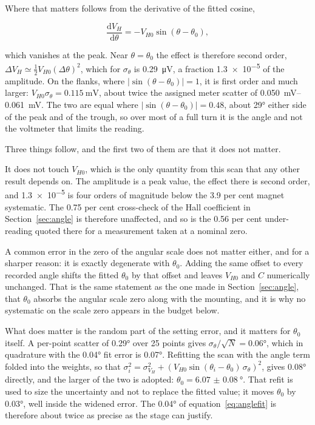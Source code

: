 \documentclass[11pt,a4paper]{article}
\begin{document}
Where that matters follows from the derivative of the fitted cosine,

\begin{equation}
\frac{\mathrm{d}V_H}{\mathrm{d}\theta} = -V_{H0}\sin(\theta-\theta_0),
\label{eq:angderiv}
\end{equation}

which vanishes at the peak. Near $\theta = \theta_0$ the effect is therefore second order,
$\Delta V_H \simeq \tfrac12 V_{H0}(\Delta\theta)^2$, which for $\sigma_\theta$ is
\qty{0.29}{\micro\volt}, a fraction \num{1.3e-5} of the amplitude. On the flanks, where
$\left|\sin(\theta-\theta_0)\right| = 1$, it is first order and much larger:
$V_{H0}\sigma_\theta = \qty{0.115}{\milli\volt}$, about twice the assigned meter scatter of
\qtyrange{0.050}{0.061}{\milli\volt}. The two are equal where
$\left|\sin(\theta-\theta_0)\right| = 0.48$, about \ang{29} either side of the peak and of the
trough, so over most of a full turn it is the angle and not the voltmeter that limits the
reading.

Three things follow, and the first two of them are that it does not matter.

It does not touch $V_{H0}$, which is the only quantity from this scan that any other result
depends on. The amplitude is a peak value, the effect there is second order, and
\num{1.3e-5} is four orders of magnitude below the \num{3.9} per cent magnet systematic. The
\num{0.75} per cent cross-check of the Hall coefficient in Section~\ref{sec:angle} is
therefore unaffected, and so is the \num{0.56} per cent under-reading quoted there for a
measurement taken at a nominal zero.

A common error in the zero of the angular scale does not matter either, and for a sharper
reason: it is exactly degenerate with $\theta_0$. Adding the same offset to every recorded
angle shifts the fitted $\theta_0$ by that offset and leaves $V_{H0}$ and $C$ numerically
unchanged. That is the same statement as the one made in Section~\ref{sec:angle}, that
$\theta_0$ absorbs the angular scale zero along with the mounting, and it is why no systematic
on the scale zero appears in the budget below.

What does matter is the random part of the setting error, and it matters for $\theta_0$
itself. A per-point scatter of \ang{0.29} over \num{25} points gives
$\sigma_\theta/\sqrt{N} = \ang{0.06}$, which in quadrature with the \ang{0.04} fit error is
\ang{0.07}. Refitting the scan with the angle term folded into the weights, so that
$\sigma_i^2 = \sigma_{V_H}^2 + \left(V_{H0}\sin(\theta_i-\theta_0)\,\sigma_\theta\right)^2$,
gives \ang{0.08} directly, and the larger of the two is adopted:
$\theta_0 = \qty{6.07(8)}{\degree}$. That refit is used to size the uncertainty and not to
replace the fitted value; it moves $\theta_0$ by \ang{0.03}, well inside the widened error.
The \ang{0.04} of equation~\eqref{eq:anglefit} is therefore about twice as precise as the
stage can justify.
\end{document}
